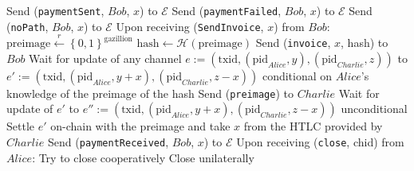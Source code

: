 \begin{algorithmic}[1]
          \State Send (\texttt{paymentSent}, $Bob$, $x$) to $\mathcal{E}$
        \Else
          \State Send (\texttt{paymentFailed}, $Bob$, $x$) to $\mathcal{E}$
        \EndIf
      \Else {}
        \State Send (\texttt{noPath}, $Bob$, $x$) to $\mathcal{E}$
      \EndIf
    \State
    \State Upon receiving (\texttt{SendInvoice}, $x$) from $Bob$:
      \State $\mathrm{preimage} \overset{r}{\gets}
      \left\{0,1\right\}^{\mathrm{gazillion}}$
      \State $\mathrm{hash} \gets \mathcal{H}\left(\mathrm{preimage}\right)$
      \State Send (\texttt{invoice}, $x$, hash) to $Bob$
      \State Wait for update of any channel $e := \left(\mathrm{txid},
      \left(\mathrm{pid}_{Alice}, y\right), \left(\mathrm{pid}_{Charlie},
      z\right)\right)$ to $e' := \left(\mathrm{txid},
      \left(\mathrm{pid}_{Alice}, y + x\right), \left(\mathrm{pid}_{Charlie}, z
      - x\right)\right)$ conditional on $Alice$'s knowledge of the preimage of
      the hash
      \State Send (\texttt{preimage}) to $Charlie$
      \State Wait for update of $e'$ to $e'' := \left(\mathrm{txid},
      \left(\mathrm{pid}_{Alice}, y + x\right), \left(\mathrm{pid}_{Charlie}, z
      - x\right)\right)$ unconditional
        \State Settle $e'$ on-chain with the preimage and take $x$ from the HTLC
        provided by $Charlie$
      \EndIf
      \State Send (\texttt{paymentReceived}, $Bob$, $x$) to $\mathcal{E}$
    \State
    \State Upon receiving (\texttt{close}, chid) from $Alice$:
        \State Try to close cooperatively 
         
          \State Close unilaterally 
        \EndIf
      \EndIf
  \end{algorithmic}
\hrulefill
